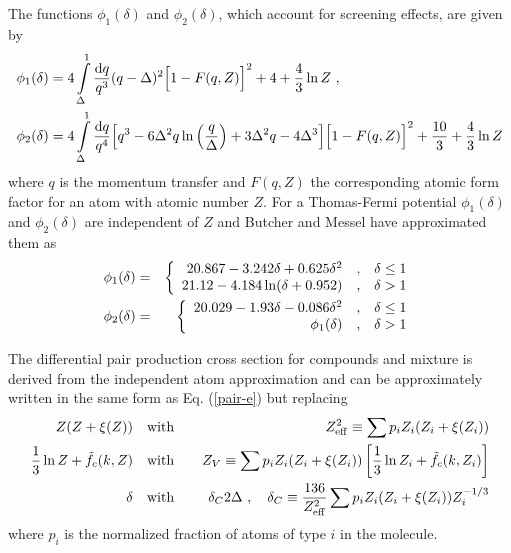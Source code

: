 The functions $\phi_1(\delta)$ and $\phi_2(\delta)$, which 
account for screening effects, are 
given by 
\begin{equation}
\begin{split}
\phi_1(\delta) & = 4 \int\limits_\Delta^1 {{\rm d}q \over q^3} 
(q - \Delta)^2 \Big[1 - F(q,Z) \Big]^2 + 4 + {4 \over 3} \ln Z~,
\\ 
\phi_2(\delta) & = 4 \int\limits_\Delta^1  {{\rm d}q \over q^4} 
\Big[q^3 - 6 \Delta^2 q \ln \left({q \over \Delta}\right) + 3 \Delta^2 q 
-4 \Delta^3 \Big] \Big[1 - F(q,Z) \Big]^2 + {10 \over 3} + {4 \over 3} \ln Z
\end{split}
\end{equation}
where $q$ is the momentum transfer and $F(q,Z)$ the corresponding 
atomic form factor for an atom with atomic 
number $Z$. For a Thomas-Fermi potential $\phi_1(\delta)$ 
and $\phi_2(\delta)$ are independent of $Z$ and Butcher and 
Messel have approximated them \cite{BM60} as
\begin{eqnarray}
\label{pair_phi}
\phi_1(\delta) & = & \left\{
\begin{array}{r@{\quad , \quad}l}
20.867 - 3.242 \delta + 0.625 \delta^2 & \delta \le 1 \\
21.12 - 4.184 \ln(\delta + 0.952) & \delta > 1
\end{array}
\right. \\
\phi_2(\delta) & = & \left\{
\begin{array}{r@{\quad , \quad}l}
20.029 - 1.93 \delta - 0.086 \delta^2 & \delta \le 1 \\
\phi_1(\delta) & \delta > 1
\end{array}
\right.
\end{eqnarray}

The differential pair production cross section for compounds 
and mixture is derived from the independent atom approximation 
and can be approximately written in the same form as Eq. (\ref{pair-e}) 
but replacing 
\begin{eqnarray}
\label{pair_replace}
Z (Z + \xi(Z)) \quad & \mbox{with} & \quad Z_{\rm eff}^2 \equiv 
\sum p_i Z_i (Z_i + \xi(Z_i) ) 
\nonumber \\
{1 \over 3} \ln Z + \tilde{f}_c(k,Z) \quad & \mbox{with} & \quad 
Z_V \equiv \sum p_i 
Z_i (Z_i + \xi(Z_i) ) \left[ {1 \over 3} \ln Z_i + \tilde{f}_c(k,Z_i) \right] 
\nonumber \\
\delta \quad & \mbox{with} & \quad \delta_C 2 \Delta~,\quad 
\delta_C \equiv {136 \over Z_{\rm eff}^2} 
\sum p_i Z_i (Z_i + \xi(Z_i) ) Z_i^{-1/3} 
\end{eqnarray}
where $p_i$ is the normalized fraction of atoms of type $i$ in 
the molecule.

